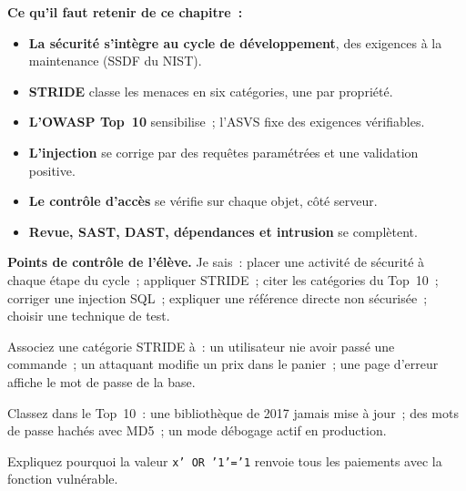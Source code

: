\begin{boxresume}
\textbf{Ce qu'il faut retenir de ce chapitre~:}
\begin{itemize}
    \item \textbf{La sécurité s'intègre au cycle de développement}, des
          exigences à la maintenance (SSDF du NIST).
    \item \textbf{STRIDE} classe les menaces en six catégories, une par
          propriété.
    \item \textbf{L'OWASP Top~10} sensibilise~; l'ASVS fixe des exigences
          vérifiables.
    \item \textbf{L'injection} se corrige par des requêtes paramétrées et
          une validation positive.
    \item \textbf{Le contrôle d'accès} se vérifie sur chaque objet, côté
          serveur.
    \item \textbf{Revue, SAST, DAST, dépendances et intrusion} se
          complètent.
\end{itemize}
\end{boxresume}

\begin{boxinfo}
\textbf{Points de contrôle de l'élève.} Je sais~: placer une activité de
sécurité à chaque étape du cycle~; appliquer STRIDE~; citer les catégories
du Top~10~; corriger une injection SQL~; expliquer une référence directe
non sécurisée~; choisir une technique de test.
\end{boxinfo}

\bigskip

\begin{boxexo}[title={\ding{45}\quad Exercice~19.1. STRIDE \niveaubase}]
Associez une catégorie STRIDE à~: un utilisateur nie avoir passé une
commande~; un attaquant modifie un prix dans le panier~; une page
d'erreur affiche le mot de passe de la base.
\end{boxexo}

\begin{boxexo}[title={\ding{45}\quad Exercice~19.2. Top 10 \niveaubase}]
Classez dans le Top~10~: une bibliothèque de 2017 jamais mise à jour~; des
mots de passe hachés avec MD5~; un mode débogage actif en production.
\end{boxexo}

\begin{boxexo}[title={\ding{45}\quad Exercice~19.3. L'injection \niveaubase}]
Expliquez pourquoi la valeur \texttt{x' OR '1'='1} renvoie tous les
paiements avec la fonction vulnérable.
\end{boxexo}

